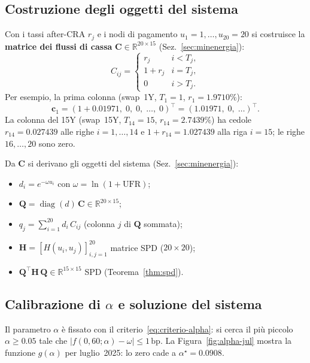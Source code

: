 \documentclass[11pt,a4paper]{article}
\theoremstyle{plain}
\theoremstyle{definition}
\theoremstyle{remark}
\newcommand{\UFR}{\ensuremath{\mathrm{UFR}}}
\newcommand{\Qmat}{\mathbf{Q}}
\newcommand{\Hmat}{\mathbf{H}}
\begin{document}
\subsection{Costruzione degli oggetti del sistema}

Con i tassi after-CRA $r_j$ e i nodi di pagamento $u_1=1,\dots,u_{20}=20$ si costruisce
la \textbf{matrice dei flussi di cassa} $\mathbf{C} \in \mathbb{R}^{20 \times 15}$
(Sez.~\ref{sec:minenergia}):
\[
  C_{ij} = \begin{cases}
    r_j     & i < T_j,\\
    1 + r_j & i = T_j,\\
    0       & i > T_j.
  \end{cases}
\]
Per esempio, la prima colonna (swap~1Y, $T_1=1$, $r_1=1.9710\%$):
\[
  \mathbf{c}_1 = (1 + 0.01971,\; 0,\; 0,\;\ldots,\; 0)^\top = (1.01971,\;0,\;\ldots)^\top.
\]
La colonna del 15Y (swap~15Y, $T_{14}=15$, $r_{14}=2.7439\%$) ha cedole
$r_{14} = 0.027439$ alle righe $i=1,\ldots,14$ e $1+r_{14}=1.027439$ alla riga $i=15$;
le righe $16,\ldots,20$ sono zero.

Da $\mathbf{C}$ si derivano gli oggetti del sistema (Sez.~\ref{sec:minenergia}):
\begin{itemize}
  \item $d_i = e^{-\omega u_i}$ con $\omega = \ln(1{+}\UFR)$;
  \item $\Qmat = \operatorname{diag}(d)\,\mathbf{C} \in \mathbb{R}^{20\times 15}$;
  \item $q_j = \sum_{i=1}^{20} d_i\, C_{ij}$ (colonna $j$ di $\Qmat$ sommata);
  \item $\Hmat = [H(u_i,u_j)]_{i,j=1}^{20}$ matrice SPD ($20\times 20$);
  \item $\Qmat^\top \Hmat\, \Qmat \in \mathbb{R}^{15\times 15}$ SPD (Teorema~\ref{thm:spd}).
\end{itemize}

\subsection{Calibrazione di $\alpha$ e soluzione del sistema}

Il parametro $\alpha$ \`e fissato con il criterio~\eqref{eq:criterio-alpha}: si cerca il
pi\`u piccolo $\alpha \ge 0.05$ tale che $|f(0,60;\alpha)-\omega| \le 1\,\text{bp}$.
La Figura~\ref{fig:alpha-jul} mostra la funzione $g(\alpha)$ per luglio~2025: lo zero
cade a $\alpha^\star = 0.0908$.
\end{document}
